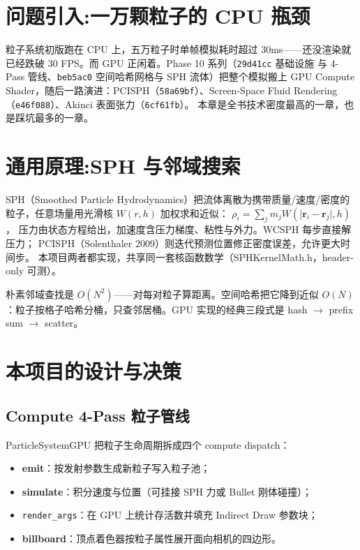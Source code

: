 \section{问题引入:一万颗粒子的 CPU 瓶颈}

粒子系统初版跑在 CPU 上，五万粒子时单帧模拟耗时超过 30ms——还没渲染就
已经跌破 30 FPS。而 GPU 正闲着。Phase 10 系列（\texttt{29d41cc} 基础设施
与 4-Pass 管线、\texttt{beb5ac0} 空间哈希网格与 SPH 流体）把整个模拟搬上
GPU Compute Shader，随后一路演进：PCISPH（\texttt{58a69bf}）、Screen-Space
Fluid Rendering（\texttt{e46f088}）、Akinci 表面张力（\texttt{6cf61fb}）。
本章是全书技术密度最高的一章，也是踩坑最多的一章。

\section{通用原理:SPH 与邻域搜索}

SPH（Smoothed Particle Hydrodynamics）把流体离散为携带质量/速度/密度的
粒子，任意场量用光滑核 $W(r,h)$ 加权求和近似：
$\rho_i = \sum_j m_j W(\lvert \mathbf{r}_i - \mathbf{r}_j\rvert, h)$，
压力由状态方程给出，加速度含压力梯度、粘性与外力。WCSPH 每步直接解压力；
PCISPH（Solenthaler 2009）则迭代预测位置修正密度误差，允许更大时间步。
本项目两者都实现，共享同一套核函数数学（SPHKernelMath.h，header-only 可测）。

朴素邻域查找是 $O(N^2)$——对每对粒子算距离。空间哈希把它降到近似
$O(N)$：粒子按格子哈希分桶，只查邻居桶。GPU 实现的经典三段式是
hash $\to$ prefix sum $\to$ scatter。

\section{本项目的设计与决策}

\subsection{Compute 4-Pass 粒子管线}

ParticleSystemGPU 把粒子生命周期拆成四个 compute dispatch：

\begin{itemize}
  \item \textbf{emit}：按发射参数生成新粒子写入粒子池；
  \item \textbf{simulate}：积分速度与位置（可挂接 SPH 力或 Bullet 刚体碰撞）；
  \item \texttt{render\_args}：在 GPU 上统计存活数并填充 Indirect Draw 参数块；
  \item \textbf{billboard}：顶点着色器按粒子属性展开面向相机的四边形。
\end{itemize}

